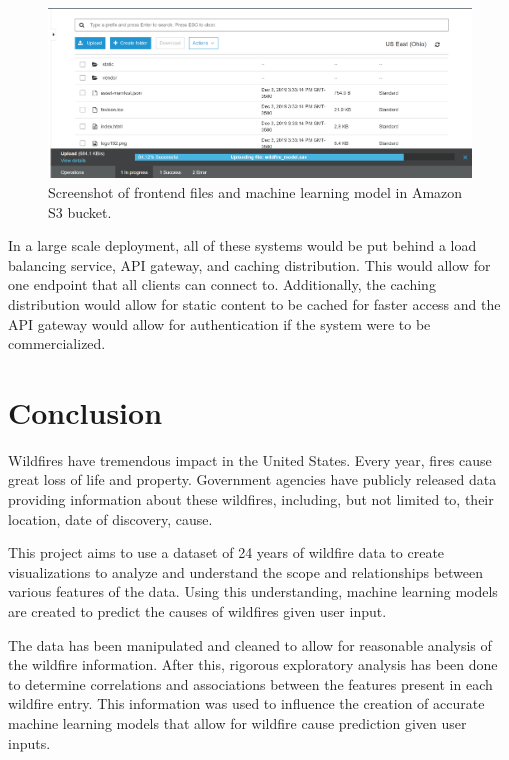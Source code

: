 \documentclass[conference]{IEEEtran}
\begin{document}
\begin{figure}
    \centering
    \includegraphics[scale=0.26]{img/s3_upload.PNG}
    \caption{Screenshot of frontend files and machine learning model in Amazon S3 bucket.}
    \label{fig:s3_upload}
\end{figure}

In a large scale deployment, all of these systems would be put behind a load balancing service, API gateway, and caching distribution. This would allow for one endpoint that all clients can connect to. Additionally, the caching distribution would allow for static content to be cached for faster access and the API gateway would allow for authentication if the system were to be commercialized. \par

\section{Conclusion}
Wildfires have tremendous impact in the United States. Every year, fires cause great loss of life and property. Government agencies have publicly released data providing information about these wildfires, including, but not limited to, their location, date of discovery, cause. \par

This project aims to use a dataset of 24 years of wildfire data to create visualizations to analyze and understand the scope and relationships between various features of the data. Using this understanding, machine learning models are created to predict the causes of wildfires given user input. \par

The data has been manipulated and cleaned to allow for reasonable analysis of the wildfire information. After this, rigorous exploratory analysis has been done to determine correlations and associations between the features present in each wildfire entry. This information was used to influence the creation of accurate machine learning models that allow for wildfire cause prediction given user inputs.
\end{document}
